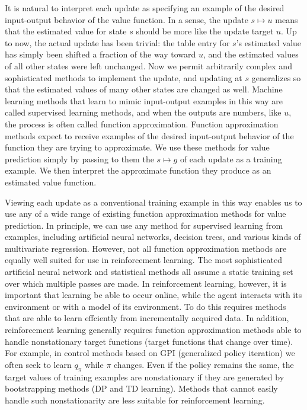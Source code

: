 \documentclass{article}
\begin{document}
It is natural to interpret each update as specifying an example of the desired input-output behavior of the value function. In a sense, the update $s \mapsto u$ means that the estimated value for 
state $s$ should be more like the update target $u$. Up to now, the actual update has been trivial: the table entry for $s$'s estimated value has simply been shifted a fraction of the way toward $u$, 
and the estimated values of all other states were left unchanged. Now we permit arbitrarily complex and sophisticated methods to implement the update, and updating at $s$ generalizes so that the estimated values 
of many other states are changed as well. Machine learning methods that learn to mimic input-output examples in this way are called supervised learning methods, and when the outputs are numbers, like $u$, the process is often called function approximation. 
Function approximation methods expect to receive examples of the desired input-output behavior of the function they are trying to approximate. We use these methods for value prediction simply by passing to them the $s \mapsto g$ of each update as a training example. 
We then interpret the approximate function they produce as an estimated value function.

Viewing each update as a conventional training example in this way enables us to use any of a wide range of existing function approximation methods for value prediction. 
In principle, we can use any method for supervised learning from examples, including artificial neural networks, decision trees, and various kinds of multivariate regression. 
However, not all function approximation methods are equally well suited for use in reinforcement learning. The most sophisticated artificial neural network 
and statistical methods all assume a static training set over which multiple passes are made. In reinforcement learning, however, it is important that learning be able to occur online, 
while the agent interacts with its environment or with a model of its environment. To do this requires methods that are able to learn effciently from incrementally acquired data. 
In addition, reinforcement learning generally requires function approximation methods able to handle nonstationary target functions (target functions that change over time). 
For example, in control methods based on GPI (generalized policy iteration) we often seek to learn $q _ { \pi }$ while $\pi$ changes. Even if the policy remains the same, 
the target values of training examples are nonstationary if they are generated by bootstrapping methods (DP and TD learning). Methods that cannot easily handle such nonstationarity are less suitable for reinforcement learning.
\end{document}
